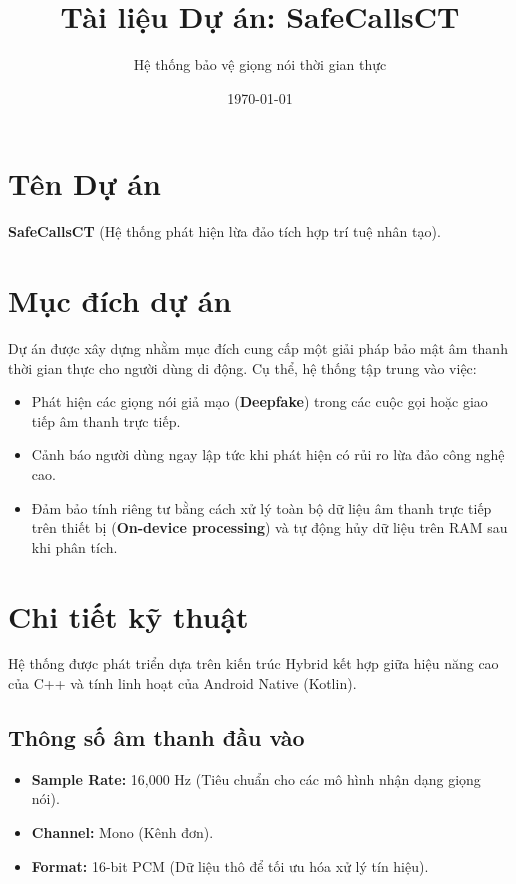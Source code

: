 \documentclass[12pt,a4paper]{article}
\title{\textbf{Tài liệu Dự án: SafeCallsCT}}
\author{Hệ thống bảo vệ giọng nói thời gian thực}
\date{\today}
\begin{document}
\maketitle

\section{Tên Dự án}
\textbf{SafeCallsCT} (Hệ thống phát hiện lừa đảo tích hợp trí tuệ nhân tạo).

\section{Mục đích dự án}
Dự án được xây dựng nhằm mục đích cung cấp một giải pháp bảo mật âm thanh thời gian thực cho người dùng di động.
Cụ thể, hệ thống tập trung vào việc:
\begin{itemize}
    \item Phát hiện các giọng nói giả mạo (\textbf{Deepfake}) trong các cuộc gọi hoặc giao tiếp âm thanh trực tiếp.
    \item Cảnh báo người dùng ngay lập tức khi phát hiện có rủi ro lừa đảo công nghệ cao.
    \item Đảm bảo tính riêng tư bằng cách xử lý toàn bộ dữ liệu âm thanh trực tiếp trên thiết bị (\textbf{On-device processing}) và tự động hủy dữ liệu trên RAM sau khi phân tích.
\end{itemize}

\section{Chi tiết kỹ thuật}
Hệ thống được phát triển dựa trên kiến trúc Hybrid kết hợp giữa hiệu năng cao của C++ và tính linh hoạt của Android Native (Kotlin).

\subsection{Thông số âm thanh đầu vào}
\begin{itemize}
    \item \textbf{Sample Rate:} 16,000 Hz (Tiêu chuẩn cho các mô hình nhận dạng giọng nói).
    \item \textbf{Channel:} Mono (Kênh đơn).
    \item \textbf{Format:} 16-bit PCM (Dữ liệu thô để tối ưu hóa xử lý tín hiệu).
\end{itemize}
\end{document}
